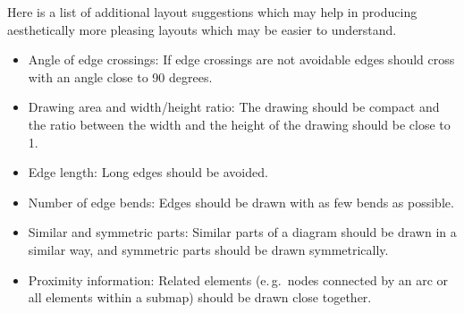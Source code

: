 Here is a list of additional layout suggestions which may help in producing aesthetically more pleasing layouts which may be easier to understand.

\begin{itemize}
  \item Angle of edge crossings: If edge crossings are not avoidable edges should cross with an angle close to 90 degrees.
  \item Drawing area and width/height ratio: The drawing should be compact and the ratio between the width and the height of the drawing should be close to 1.
  \item Edge length: Long edges should be avoided.
  \item Number of edge bends: Edges should be drawn with as few bends as possible.
  \item Similar and symmetric parts: Similar parts of a diagram should be drawn in a similar way, and symmetric parts should be drawn symmetrically.
  \item Proximity information: Related elements (e.\,g.~nodes connected by an arc or all elements within a submap) should be drawn close together.
\end{itemize} 

\normalcolor